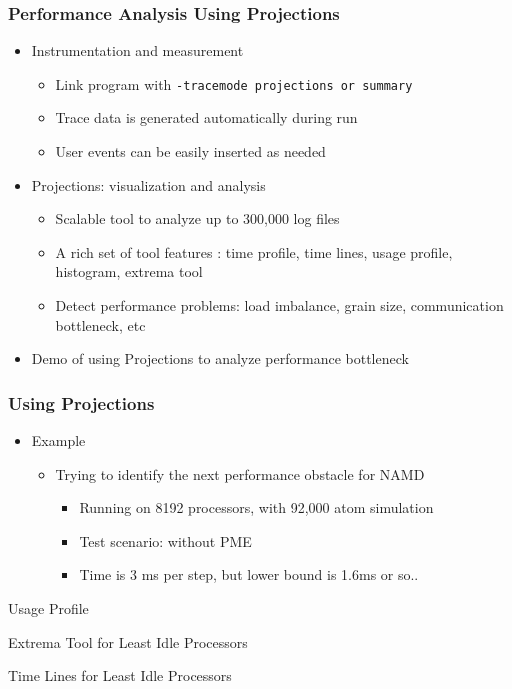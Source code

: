\begin{frame}
  \frametitle{Performance Analysis Using Projections}
  \begin{itemize}
  \item Instrumentation and measurement
  \begin{itemize}
  \item Link program with {\tt -tracemode projections or summary}
  \item Trace data is generated automatically during run
  \item User events can be easily inserted as needed
  \end{itemize}
  \item Projections: visualization and analysis
  \begin{itemize}
  \item Scalable tool to analyze up to 300,000 log files
  \item A rich set of tool features : time profile, time lines, usage profile, histogram, extrema tool
  \item Detect performance problems: load imbalance, grain size, communication bottleneck, etc 
  \end{itemize}
  \item Demo of using Projections to analyze performance bottleneck
  \end{itemize}

\end{frame}

\begin{frame}
\frametitle{Using Projections }
\begin{itemize}
\item Example
\begin{itemize}
\item Trying to identify the next performance obstacle for NAMD
\begin{itemize}
\item Running on 8192 processors, with 92,000 atom simulation
\item Test scenario: without PME
\item Time is 3 ms per step, but lower bound is 1.6ms or so..
\end{itemize}
\end{itemize}
\end{itemize}
\end{frame}

\begin{frame}{Usage Profile}
\end{frame}

\begin{frame}{Extrema Tool for Least Idle Processors}
\end{frame}

\begin{frame}{Time Lines for Least Idle Processors}
\end{frame}
